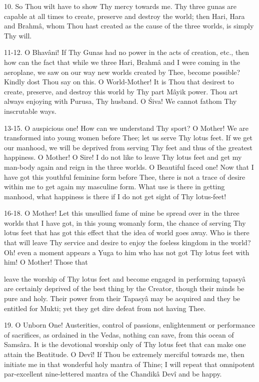 10. So Thou wilt have to show Thy mercy towards me. Thy three gunas are capable at all times to create, preserve and destroy the world; then Hari, Hara and Brahm\^a, whom Thou hast created as the cause of the three worlds, is simply Thy will.

11-12. O Bhav\^ani! If Thy Gunas had no power in the acts of creation, etc., then how can the fact that while we three Hari, Brahm\^a and I were coming in the aeroplane, we saw on our way new worlds created by Thee, become possible? Kindly dost Thou say on this. O World-Mother! It is Thou that desirest to create, preserve, and destroy this world by Thy part M\^ayik power. Thou art always enjoying with Purusa, Thy husband. O \'Siva! We cannot fathom Thy inscrutable ways.

13-15. O auspicious one! How can we understand Thy sport? O Mother! We are transformed into young women before Thee; let us serve Thy lotus feet. If we get our manhood, we will be deprived from serving Thy feet and thus of the greatest happiness. O Mother! O Sire! I do not like to leave Thy lotus feet and get my man-body again and reign in the three worlds. O Beautiful faced one! Now that I have got this youthful feminine form before Thee, there is not a trace of desire within me to get again my masculine form. What use is there in getting manhood, what happiness is there if I do not get sight of Thy lotus-feet!

16-18. O Mother! Let this unsullied fame of mine be spread over in the three worlds that I have got, in this young womanly form, the chance of serving Thy lotus feet that has got this effect that the idea of world goes away. Who is there that will leave Thy service and desire to enjoy the foeless kingdom in the world? Oh! even a moment appears a Yuga to him who has not got Thy lotus feet with him! O Mother! Those that

leave the worship of Thy lotus feet and become engaged in performing tapasy\^a are certainly deprived of the best thing by the Creator, though their minds be pure and holy. Their power from their Tapasy\^a may be acquired and they be entitled for Mukti; yet they get dire defeat from not having Thee.

19. O Unborn One! Austerities, control of passions, enlightenment or performance of sacrifices, as ordained in the Vedas, nothing can save, from this ocean of Sams\^ara. It is the devotional worship only of Thy lotus feet that can make one attain the Beatitude. O Dev\^i! If Thou be extremely merciful towards me, then initiate me in that wonderful holy mantra of Thine; I will repeat that omnipotent par-excellent nine-lettered mantra of the Chandik\^a Dev\^i and be happy.

